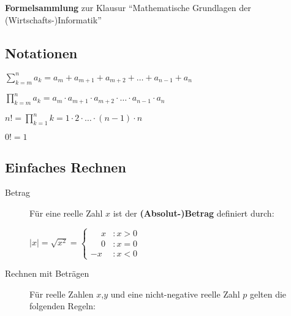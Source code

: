 \documentclass[
  ngerman,
  a4paper,
  landscape, fontsize=9pt, version=first, enabledeprecatedfontcommands,
  DIV=6]{scrartcl}
\author{}
\date{\vspace{-2.5em}}
\providecommand{\tightlist}{%
  \setlength{\itemsep}{0pt}\setlength{\parskip}{0pt}}
\begin{document}
%
%
%

{\Huge\sffamily\textcolor{FOMVoll}{{\bfseries Formelsammlung} zur Klausur \enquote{Mathematische Grundlagen der (Wirtschafts-)Informatik}}}

\setlength{\columnsep}{0.75cm}
\begin{multicols}{3}

\hypertarget{notationen}{%
\subsection{Notationen}\label{notationen}}

\begin{description}
\tightlist
\item[Summenzeichen]
\(\displaystyle \sum\limits_{k=m}^n a_k = a_m + a_{m+1} + a_{m+2} + \dotsc + a_{n-1} + a_{n}\)
\item[Produktzeichen]
\(\displaystyle \prod\limits_{k=m}^n a_k = a_m \cdot a_{m+1} \cdot a_{m+2} \cdot \dotsc \cdot a_{n-1} \cdot a_{n}\)
\item[Fakultät]
\(\displaystyle n! = \prod\limits_{k=1}^n k = 1 \cdot 2 \cdot \dotsc \cdot (n-1) \cdot n\)

\(\displaystyle 0! = 1\)
\end{description}

\hypertarget{einfaches-rechnen}{%
\subsection{Einfaches Rechnen}\label{einfaches-rechnen}}

\begin{description}
\item[Betrag]
Für eine reelle Zahl \(x\) ist der \textbf{(Absolut-)Betrag} definiert
durch:

\(\displaystyle |x| = \sqrt{x^2} = \begin{cases} \phantom{-}x &: x > 0 \\ \phantom{-}0 &: x=0 \\ -x &: x <0 \end{cases}\)
\item[Rechnen mit Beträgen]
Für reelle Zahlen \(x\),\(y\) und eine nicht-negative reelle Zahl \(p\)
gelten die folgenden Regeln:


\end{description}
\end{multicols}
\end{document}
